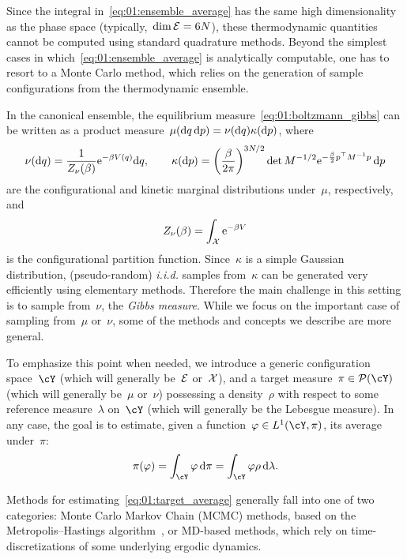 Since the integral in~\eqref{eq:01:ensemble_average} has the same high dimensionality as the phase space (typically,~${\dim \mathcal{E}=6N}$), these thermodynamic quantities cannot be computed using standard quadrature methods.
Beyond the simplest cases in which~\eqref{eq:01:ensemble_average} is analytically computable, one has to resort to a Monte Carlo method, which relies on the generation of sample configurations from the thermodynamic ensemble.

In the canonical ensemble, the equilibrium measure~\eqref{eq:01:boltzmann_gibbs} can be written as a product measure~${\mu(\mathrm{d} q\,\mathrm{d} p) = \nu(\mathrm{d} q)\kappa(\mathrm{d} p)}$, where
\begin{equation}
    \label{eq:01:gibbs}
    \nu(\mathrm{d} q) = \frac1{Z_\nu(\beta)}\mathrm{e}^{-\beta V(q)} \mathrm{d} q,\qquad \kappa(\mathrm{d} p) = \left(\frac{\beta}{2\pi}\right)^{3N/2}\det M^{-1/2}\mathrm{e}^{-\frac{\beta}{2}p^\top M^{-1}p}\,\mathrm{d} p
\end{equation}
are the configurational and kinetic marginal distributions under~$\mu$, respectively, and
\begin{equation}
Z_\nu(\beta) = \int_{\mathcal{X}} \mathrm{e}^{-\beta V}
\end{equation}
is the configurational partition function. Since~$\kappa$ is a simple Gaussian distribution, (pseudo-random) \textit{i.i.d.} samples from~$\kappa$ can be generated very efficiently using elementary methods.
Therefore the main challenge in this setting is to sample from~$\nu$, the \textit{Gibbs measure}. While we focus on the important case of sampling from~$\mu$ or~$\nu$, some of the methods and concepts we describe are more general.

To emphasize this point when needed, we introduce a generic configuration space~$\cY$ (which will generally be~$\mathcal{E}$ or~$\mathcal{X}$), and a target measure~$\pi\in\mathcal P(\cY)$ (which will generally be~$\mu$ or~$\nu$) possessing a density~$\rho$ with respect to some reference measure~$\lambda$ on~$\cY$ (which will generally be the Lebesgue measure).
In any case, the goal is to estimate, given a function~$\varphi\in L^1(\cY,\pi)$, its average under~$\pi$:
\begin{equation}
    \label{eq:01:target_average}
    \pi(\varphi)=\int_{\cY}\varphi\,\d \pi = \int_{\cY}\varphi \rho\,\d \lambda.
\end{equation}

Methods for estimating~\eqref{eq:01:target_average} generally fall into one of two categories: Monte Carlo Markov Chain (MCMC) methods, based on the Metropolis--Hastings algorithm~\cite{MRTT53}, or MD-based methods, which rely on time-discretizations of some underlying ergodic dynamics.

